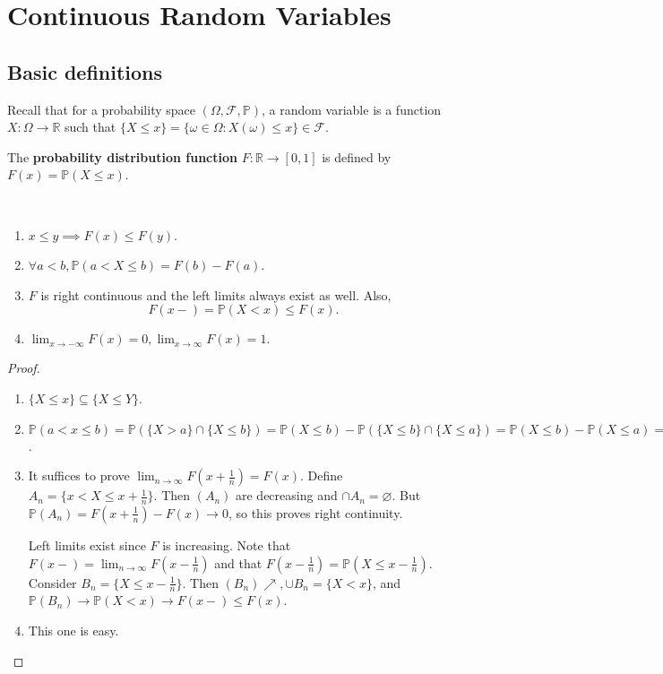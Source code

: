 \section{Continuous Random Variables}
\subsection{Basic definitions}
Recall that for a probability space $(\Omega,\mathscr F,\mathbb P)$, a random variable is a function $X:\Omega\to\mathbb R$ such that $\{X\le x\}=\{\omega\in\Omega:X(\omega)\le x\}\in\mathscr F$. 

\begin{definition}
    The \textbf{probability distribution function} $ F:\mathbb{R}\to [0,1] $ is defined by $F(x)=\mathbb P(X\le x)$.
\end{definition}

\begin{proposition}\
    \begin{enumerate}
        \item $x\le y\implies F(x)\le F(y)$.
        \item $\forall a<b,\mathbb P(a<X\le b)=F(b)-F(a)$.
        \item $F$ is right continuous and the left limits always exist as well. Also,
        $$F(x-)=\mathbb{P}(X<x)\le F(x).$$
        \item $\displaystyle \lim_{x\to-\infty}F(x)=0,\lim_{x\to\infty}F(x)=1.$
    \end{enumerate}
\end{proposition}
\begin{proof}\
    \begin{enumerate}
        \item $ \{X\le x\} \subseteq \{X\le Y\} $.
        \item $ \mathbb{P}(a<x\le b)=\mathbb{P}(\{X>a\}\cap \{X\le b\})=\mathbb{P}(X\le b)-\mathbb{P}(\{X\le b\}\cap \{X\le a\})=\mathbb{P}(X\le b)-\mathbb{P}(X\le a)=F(b)-F(a) $.
        \item It suffices to prove $ \lim_{n \to \infty} F(x+\frac{1}{n})=F(x) $. Define $ A_n=\{x<X\le x+\frac{1}{n}\} $. Then $(A_n)$ are decreasing and $ \cap A_n = \varnothing $. But $ \mathbb{P}(A_n)=F(x+\frac{1}{n})-F(x)\to 0 $, so this proves right continuity. 

        Left limits exist since $F$ is increasing. Note that $ F(x-)=\lim_{n \to \infty} F(x-\frac{1}{n}) $ and that $ F(x-\frac{1}{n})=\mathbb{P}(X\le x-\frac{1}{n}) $. Consider $ B_n=\{X\le x-\frac{1}{n}\} $. Then $ (B_n) \nearrow, \cup B_n=\{X<x\} $, and $ \mathbb{P}(B_n)\to\mathbb{P}(X<x)\to F(x-)\le F(x) $.
        \item This one is easy.
    \end{enumerate}
\end{proof}

